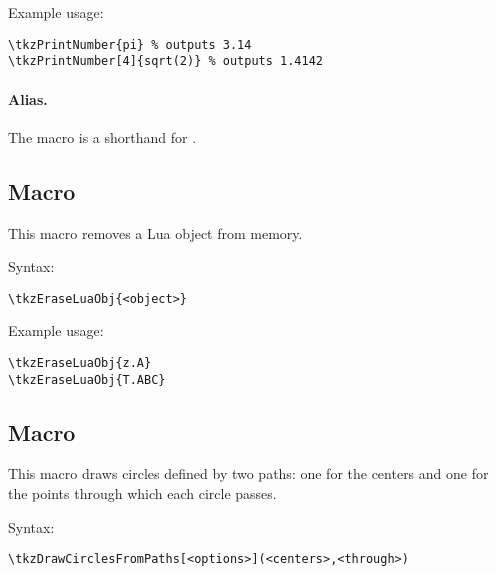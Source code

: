 \noindent
Example usage:

\begin{mybox}
\begin{verbatim}
\tkzPrintNumber{pi} % outputs 3.14
\tkzPrintNumber[4]{sqrt(2)} % outputs 1.4142
\end{verbatim}
\end{mybox}

\paragraph{Alias.} The macro  is a shorthand for .

\subsection{Macro } %
\label{sub:macro_tkzEraseLuaObj}

This macro removes a Lua object from memory.

\medskip
\noindent
Syntax:

\begin{verbatim}
\tkzEraseLuaObj{<object>}
\end{verbatim}

\noindent
Example usage:

\begin{mybox}
\begin{verbatim}
\tkzEraseLuaObj{z.A}
\tkzEraseLuaObj{T.ABC}
\end{verbatim}
\end{mybox}




\subsection{Macro } %
\label{sub:macro_tkzDrawCirclesFromPaths}

This macro draws circles defined by two paths: one for the centers and one for the points through which each circle passes.

\medskip
\noindent
Syntax:

\begin{verbatim}
\tkzDrawCirclesFromPaths[<options>](<centers>,<through>)
\end{verbatim}

